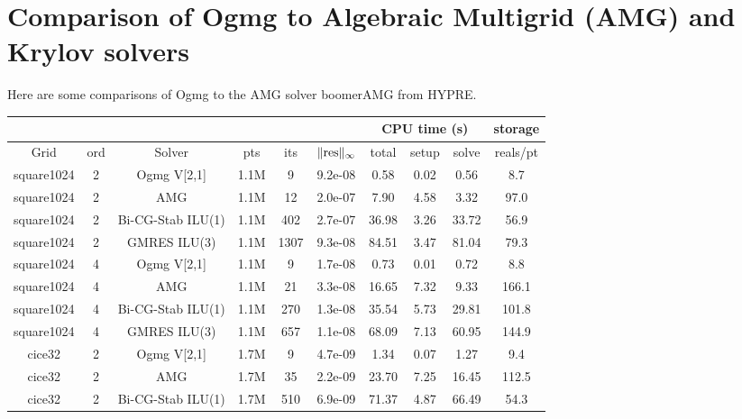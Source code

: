 \clearpage
\section{Comparison of Ogmg to Algebraic Multigrid (AMG) and Krylov solvers} \label{sec:comparisonKrylovAndAMG}

Here are some comparisons of Ogmg to the AMG solver boomerAMG from HYPRE.

\begin{table}[hbt]
\begin{center}
\begin{tabular}{|c|c|c|c|c|c|c|c|c|c|} \hline
  \multicolumn{6}{|c|}{} & \multicolumn{3}{|c|}{CPU time (s)} & storage  \\ \hline
    Grid & ord &   Solver          &    pts  & its  & $\|{\rm res}\|_\infty$ & total    & setup    & solve & reals/pt \\ \hline
%
 square1024 &  2  &  Ogmg V[2,1]       &   1.1M  &    9  &    9.2e-08       &    0.58  &    0.02  &    0.56  &     8.7 \\
 square1024 &  2  &  AMG               &   1.1M  &   12  &    2.0e-07       &    7.90  &    4.58  &    3.32  &    97.0 \\
 square1024 &  2  &  Bi-CG-Stab ILU(1) &   1.1M  &  402  &    2.7e-07       &   36.98  &    3.26  &   33.72  &    56.9 \\
 square1024 &  2  &  GMRES ILU(3)      &   1.1M  & 1307  &    9.3e-08       &   84.51  &    3.47  &   81.04  &    79.3 \\
\hline
 square1024 &  4  &  Ogmg V[2,1]       &   1.1M  &    9  &    1.7e-08       &    0.73  &    0.01  &    0.72  &     8.8 \\
 square1024 &  4  &  AMG               &   1.1M  &   21  &    3.3e-08       &   16.65  &    7.32  &    9.33  &   166.1 \\
 square1024 &  4  &  Bi-CG-Stab ILU(1) &   1.1M  &  270  &    1.3e-08       &   35.54  &    5.73  &   29.81  &   101.8 \\
 square1024 &  4  &  GMRES ILU(3)      &   1.1M  &  657  &    1.1e-08       &   68.09  &    7.13  &   60.95  &   144.9 \\
\hline
 cice32 &  2  &  Ogmg V[2,1]       &   1.7M  &    9  &    4.7e-09       &    1.34  &    0.07  &    1.27  &     9.4 \\
 cice32 &  2  &  AMG               &   1.7M  &   35  &    2.2e-09       &   23.70  &    7.25  &   16.45  &   112.5 \\
 cice32 &  2  &  Bi-CG-Stab ILU(1) &   1.7M  &  510  &    6.9e-09       &   71.37  &    4.87  &   66.49  &    54.3 \\

\end{tabular}
\end{center}
\end{table}

